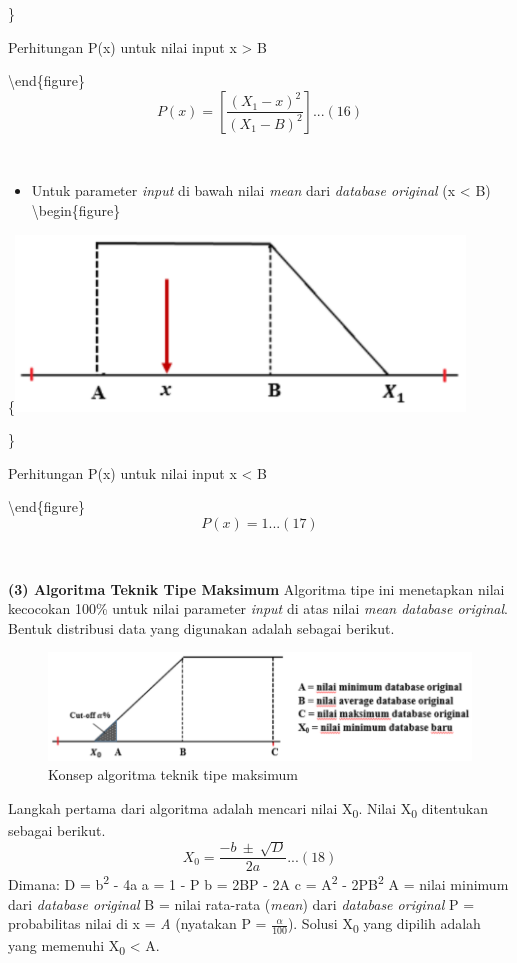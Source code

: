 \documentclass[
]{book}
\providecommand{\tightlist}{%
  \setlength{\itemsep}{0pt}\setlength{\parskip}{0pt}}
\begin{document}
\}

\caption{Perhitungan P(x) untuk nilai input x > B}

\label{fig:unnamed-chunk-24}
\textbackslash end\{figure\}
\[P(x) = \left[\frac{(X_1-x)^2}{(X_1-B)^2} \right]...(16)\]

~

\begin{itemize}
\tightlist
\item
  Untuk parameter \emph{input} di bawah nilai \emph{mean} dari \emph{database original} (x \textless{} B)
  \textbackslash begin\{figure\}
\end{itemize}

\{\centering \includegraphics[width=0.5\linewidth]{images/screening/kecilB1}

\}

\caption{Perhitungan P(x) untuk nilai input x < B}

\label{fig:unnamed-chunk-25}
\textbackslash end\{figure\}
\[P(x) = 1...(17)\]

~

\textbf{(3) Algoritma Teknik Tipe Maksimum}
Algoritma tipe ini menetapkan nilai kecocokan 100\% untuk nilai parameter \emph{input} di atas nilai \emph{mean database original}. Bentuk distribusi data yang digunakan adalah sebagai berikut.

\begin{figure}

{\centering \includegraphics[width=0.5\linewidth]{images/screening/tipe_maksimum} 

}

\caption{Konsep algoritma teknik tipe maksimum}\label{fig:unnamed-chunk-26}
\end{figure}

Langkah pertama dari algoritma adalah mencari nilai X\textsubscript{0}. Nilai X\textsubscript{0} ditentukan sebagai berikut.
\[X_0 = \frac{-b\ ±\ \sqrt{D} }{2a}...(18)\]
Dimana:
D = b\textsuperscript{2} - 4a
a = 1 - P
b = 2BP - 2A
c = A\textsuperscript{2} - 2PB\textsuperscript{2}
A = nilai minimum dari \emph{database original}
B = nilai rata-rata (\emph{mean}) dari \emph{database original}
P = probabilitas nilai di x = \emph{A} (nyatakan P = \(\frac{\alpha}{100}\)).
Solusi X\textsubscript{0} yang dipilih adalah yang memenuhi X\textsubscript{0} \textless{} A.
\end{document}
